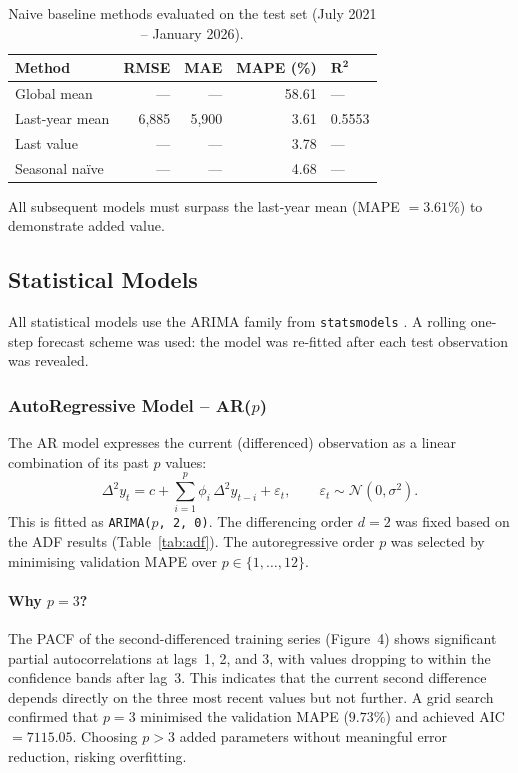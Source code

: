 \documentclass[12pt,a4paper]{article}
\begin{document}
\begin{table}[H]
\centering
\caption{Naive baseline methods evaluated on the test set (July 2021 -- January 2026).}
\label{tab:naive}
\begin{tabular}{@{}lrrrl@{}}
\toprule
\textbf{Method} & \textbf{RMSE} & \textbf{MAE} & \textbf{MAPE (\%)} & $\boldsymbol{R^2}$ \\
\midrule
Global mean      & ---   & ---   & 58.61  & ---    \\
Last-year mean   & 6,885 & 5,900 & 3.61   & 0.5553 \\
Last value       & ---   & ---   & 3.78   & ---    \\
Seasonal na\"ive & ---   & ---   & 4.68   & ---    \\
\bottomrule
\end{tabular}
\end{table}

All subsequent models must surpass the last-year mean (MAPE $= 3.61\%$) to demonstrate added value.

\subsection{Statistical Models}

All statistical models use the ARIMA family from \texttt{statsmodels} \citep{seabold2010}. A rolling one-step forecast scheme was used: the model was re-fitted after each test observation was revealed.

\subsubsection{AutoRegressive Model -- AR($p$)}

The AR model expresses the current (differenced) observation as a linear combination of its past $p$ values:
\begin{equation}
  \Delta^2 y_t = c + \sum_{i=1}^{p}\phi_i\,\Delta^2 y_{t-i} + \varepsilon_t, \qquad \varepsilon_t \sim \mathcal{N}(0,\sigma^2).
  \label{eq:ar}
\end{equation}
This is fitted as \texttt{ARIMA($p$, 2, 0)}. The differencing order $d=2$ was fixed based on the ADF results (Table~\ref{tab:adf}). The autoregressive order $p$ was selected by minimising validation MAPE over $p \in \{1, \ldots, 12\}$.

\paragraph{Why $p = 3$?}
The PACF of the second-differenced training series (Figure~4) shows significant partial autocorrelations at lags~1, 2, and 3, with values dropping to within the confidence bands after lag~3. This indicates that the current second difference depends directly on the three most recent values but not further. A grid search confirmed that $p = 3$ minimised the validation MAPE ($9.73\%$) and achieved AIC $= 7115.05$. Choosing $p > 3$ added parameters without meaningful error reduction, risking overfitting.
\end{document}
